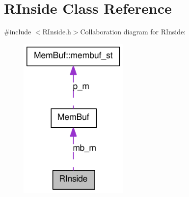 \hypertarget{classRInside}{
\section{RInside Class Reference}
\label{classRInside}
}


{\ttfamily \#include $<$RInside.h$>$}Collaboration diagram for RInside:\nopagebreak
\begin{figure}[H]
\begin{center}
\leavevmode
\includegraphics[width=152pt]{classRInside__coll__graph}
\end{center}
\end{figure}
